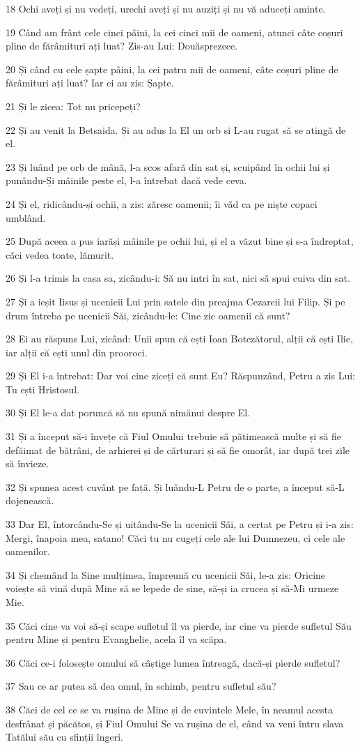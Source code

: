 \par 18 Ochi aveți și nu vedeți, urechi aveți și nu auziți și nu vă aduceți aminte.
\par 19 Când am frânt cele cinci pâini, la cei cinci mii de oameni, atunci câte coșuri pline de fărâmituri ați luat? Zis-au Lui: Douăsprezece.
\par 20 Și când cu cele șapte pâini, la cei patru mii de oameni, câte coșuri pline de fărâmituri ați luat? Iar ei au zis: Șapte.
\par 21 Și le zicea: Tot nu pricepeți?
\par 22 Și au venit la Betsaida. Și au adus la El un orb și L-au rugat să se atingă de el.
\par 23 Și luând pe orb de mână, l-a scos afară din sat și, scuipând în ochii lui și punându-Și mâinile peste el, l-a întrebat dacă vede ceva.
\par 24 Și el, ridicându-și ochii, a zis: zăresc oamenii; îi văd ca pe niște copaci umblând.
\par 25 După aceea a pus iarăși mâinile pe ochii lui, și el a văzut bine și s-a îndreptat, căci vedea toate, lămurit.
\par 26 Și l-a trimis la casa sa, zicându-i: Să nu intri în sat, nici să spui cuiva din sat.
\par 27 Și a ieșit Iisus și ucenicii Lui prin satele din preajma Cezareii lui Filip. Și pe drum întreba pe ucenicii Săi, zicându-le: Cine zic oamenii că sunt?
\par 28 Ei au răspuns Lui, zicând: Unii spun că ești Ioan Botezătorul, alții că ești Ilie, iar alții că ești unul din prooroci.
\par 29 Și El i-a întrebat: Dar voi cine ziceți că sunt Eu? Răspunzând, Petru a zis Lui: Tu ești Hristosul.
\par 30 Și El le-a dat poruncă să nu spună nimănui despre El.
\par 31 Și a început să-i învețe că Fiul Omului trebuie să pătimească multe și să fie defăimat de bătrâni, de arhierei și de cărturari și să fie omorât, iar după trei zile să învieze.
\par 32 Și spunea acest cuvânt pe față. Și luându-L Petru de o parte, a început să-L dojenească.
\par 33 Dar El, întorcându-Se și uitându-Se la ucenicii Săi, a certat pe Petru și i-a zis: Mergi, înapoia mea, satano! Căci tu nu cugeți cele ale lui Dumnezeu, ci cele ale oamenilor.
\par 34 Și chemând la Sine mulțimea, împreună cu ucenicii Săi, le-a zis: Oricine voiește să vină după Mine să se lepede de sine, să-și ia crucea și să-Mi urmeze Mie.
\par 35 Căci cine va voi să-și scape sufletul îl va pierde, iar cine va pierde sufletul Său pentru Mine și pentru Evanghelie, acela îl va scăpa.
\par 36 Căci ce-i folosește omului să câștige lumea întreagă, dacă-și pierde sufletul?
\par 37 Sau ce ar putea să dea omul, în schimb, pentru sufletul său?
\par 38 Căci de cel ce se va rușina de Mine și de cuvintele Mele, în neamul acesta desfrânat și păcătos, și Fiul Omului Se va rușina de el, când va veni întru slava Tatălui său cu sfinții îngeri.

